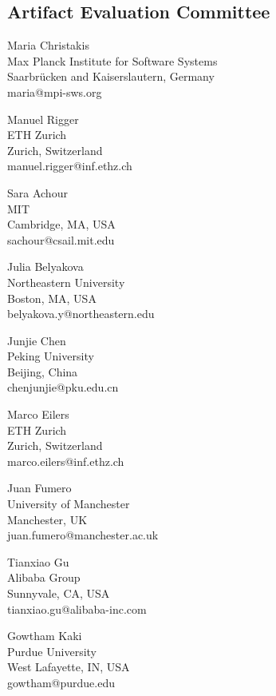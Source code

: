 \documentclass[a4paper,UKenglish]{dartsmaster-v2019}
\begin{document}
\begin{participants}

\chapter[Committee]{Artifact Evaluation Committee}

\participant Maria Christakis\\
	Max Planck Institute for Software Systems\\
	Saarbrücken and Kaiserslautern, Germany\\
	maria@mpi-sws.org

\participant Manuel Rigger\\
	ETH Zurich\\
	Zurich, Switzerland\\
	manuel.rigger@inf.ethz.ch

\participant Sara Achour\\
  MIT\\
  Cambridge, MA, USA\\
  sachour@csail.mit.edu

\participant Julia Belyakova\\
	Northeastern University\\
	Boston, MA, USA\\
	belyakova.y@northeastern.edu

\participant Junjie Chen\\
	Peking University\\
	Beijing, China\\
	chenjunjie@pku.edu.cn

\participant Marco Eilers\\
	ETH Zurich\\
	Zurich, Switzerland\\
	marco.eilers@inf.ethz.ch

\participant Juan Fumero\\
	University of Manchester\\
	Manchester, UK\\
	juan.fumero@manchester.ac.uk

\participant Tianxiao Gu\\
	Alibaba Group\\
	Sunnyvale, CA, USA\\
	tianxiao.gu@alibaba-inc.com

\participant Gowtham Kaki\\
	Purdue University\\
	West Lafayette, IN, USA\\
	gowtham@purdue.edu


\end{participants}
\end{document}
